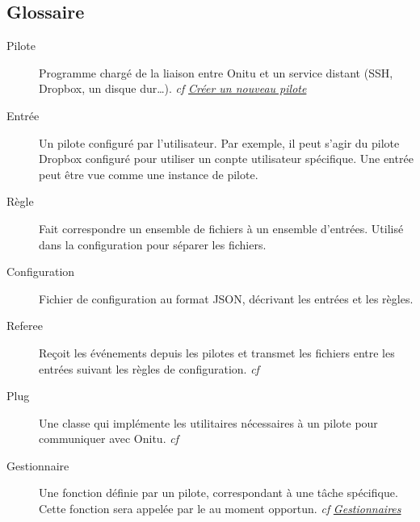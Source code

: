 \documentclass[letterpaper,10pt,english]{sphinxmanual}
\begin{document}
\subsection{Glossaire}
\label{intro:glossary}\begin{description}
\item[{Pilote}] \leavevmode{}\label{intro:term-driver}
Programme chargé de la liaison entre Onitu et un service distant (SSH, Dropbox, un disque dur…). \emph{cf} {\hyperref[drivers::doc]{\emph{Créer un nouveau pilote}}}

\item[{Entrée}] \leavevmode{}\label{intro:term-entry}
Un pilote configuré par l'utilisateur. Par exemple, il peut s'agir du pilote Dropbox configuré pour utiliser un conpte utilisateur spécifique. Une entrée peut être vue comme une instance de pilote.

\item[{Règle}] \leavevmode{}\label{intro:term-rule}
Fait correspondre un ensemble de fichiers à un ensemble d'entrées. Utilisé dans la configuration pour séparer les fichiers.

\item[{Configuration}] \leavevmode{}\label{intro:term-setup}
Fichier de configuration au format JSON, décrivant les entrées et les règles.

\item[{Referee}] \leavevmode{}\label{intro:term-referee}
Reçoit les événements depuis les pilotes et transmet les fichiers entre les entrées suivant les règles de configuration. \emph{cf} {\hyperref[components:onitu.referee.Referee]{}}

\item[{Plug}] \leavevmode{}\label{intro:term-plug}
Une classe qui implémente les utilitaires nécessaires à un pilote pour communiquer avec Onitu. \emph{cf} {\hyperref[drivers:onitu.api.Plug]{}}

\item[{Gestionnaire}] \leavevmode{}\label{intro:term-handler}
Une fonction définie par un pilote, correspondant à une tâche spécifique. Cette fonction sera appelée par le {\hyperref[drivers:onitu.api.Plug]{}} au moment opportun. \emph{cf} {\hyperref[drivers:handlers]{\emph{Gestionnaires}}}

\end{description}
\end{document}

